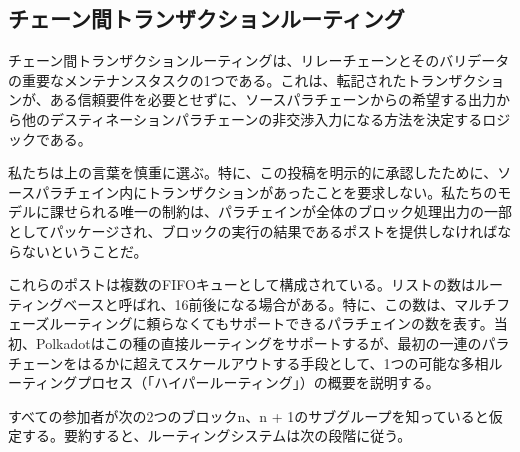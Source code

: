 \hypertarget{ux30c1ux30a7ux30fcux30f3ux9593ux30c8ux30e9ux30f3ux30b6ux30afux30b7ux30e7ux30f3ux30ebux30fcux30c6ux30a3ux30f3ux30b0}{%
\subsection{チェーン間トランザクションルーティング}\label{ux30c1ux30a7ux30fcux30f3ux9593ux30c8ux30e9ux30f3ux30b6ux30afux30b7ux30e7ux30f3ux30ebux30fcux30c6ux30a3ux30f3ux30b0}}

チェーン間トランザクションルーティングは、リレーチェーンとそのバリデータの重要なメンテナンスタスクの1つである。これは、転記されたトランザクションが、ある信頼要件を必要とせずに、ソースパラチェーンからの希望する出力から他のデスティネーションパラチェーンの非交渉入力になる方法を決定するロジックである。

私たちは上の言葉を慎重に選ぶ。特に、この投稿を明示的に承認したために、ソースパラチェイン内にトランザクションがあったことを要求しない。私たちのモデルに課せられる唯一の制約は、パラチェインが全体のブロック処理出力の一部としてパッケージされ、ブロックの実行の結果であるポストを提供しなければならないということだ。

これらのポストは複数のFIFOキューとして構成されている。リストの数はルーティングベースと呼ばれ、16前後になる場合がある。特に、この数は、マルチフェーズルーティングに頼らなくてもサポートできるパラチェインの数を表す。当初、Polkadotはこの種の直接ルーティングをサポートするが、最初の一連のパラチェーンをはるかに超えてスケ​​ールアウトする手段として、1つの可能な多相ルーティングプロセス（「ハイパールーティング」）の概要を説明する。

すべての参加者が次の2つのブロックn、n +
1のサブグループを知っていると仮定する。要約すると、ルーティングシステムは次の段階に従う。

